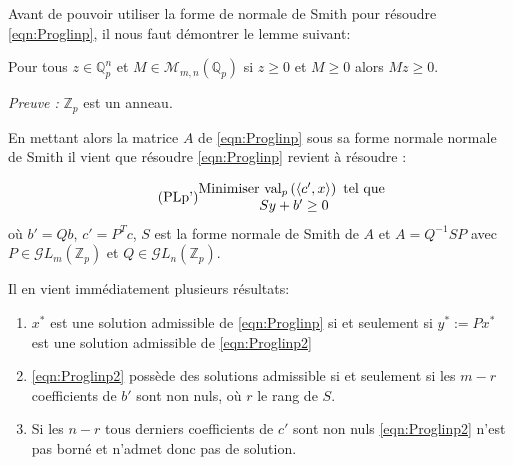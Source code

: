Avant de pouvoir utiliser la forme de normale de Smith pour résoudre \ref{eqn:Proglinp}, il nous faut démontrer le lemme suivant:

\begin{lemme}
Pour tous $z \in \mathbb{Q}_{ p } ^n$ et $M \in \mathcal{M}_{m,n}\left( \mathbb{Q}_{ p }  \right)  $ si $z\ge 0$ et $M\ge 0$ alors $Mz\ge 0$.  
\end{lemme}
\textit{Preuve :} $\mathbb{Z}_p$ est un anneau. \hfill\qedsymbol



En mettant alors la matrice $A$ de \ref{eqn:Proglinp} sous sa forme normale normale de Smith il vient que résoudre \ref{eqn:Proglinp} revient à résoudre :    


\begin{equation}
	  \tag{PLp'}
\begin{matrix}
	\text{Minimiser } \text{val}_p\left(\left<c',x \right>\right) \text{ tel que }\\
	Sy + b' \ge 0
 \end{matrix}
	    \label{eqn:Proglinp2}
\end{equation}
où $b' = Qb$, $c' = P^Tc$, $S$ est la forme normale de Smith de $A$ et $A = Q^{-1} S P$ avec $P \in \mathcal{G}L_m\left( \mathbb{Z}_p \right)$ et $ Q \in \mathcal{G}L_n\left( \mathbb{Z}_p \right)$.

\begin{remarques}
	
Il en vient immédiatement plusieurs résultats:
\begin{enumerate}
	\item $x^*$ est une solution admissible de \ref{eqn:Proglinp} si et seulement si $y^* := P x^*$ est une solution admissible de \ref{eqn:Proglinp2}
	\item \ref{eqn:Proglinp2} possède des solutions admissible si et seulement si les $m-r$ coefficients de $b'$ sont non nuls, où $r$ le rang de $S$.     
	\item Si les $n-r$ tous derniers coefficients de $c'$ sont non nuls \ref{eqn:Proglinp2} n'est pas borné et n'admet donc pas de solution.   
\end{enumerate}

\end{remarques}

